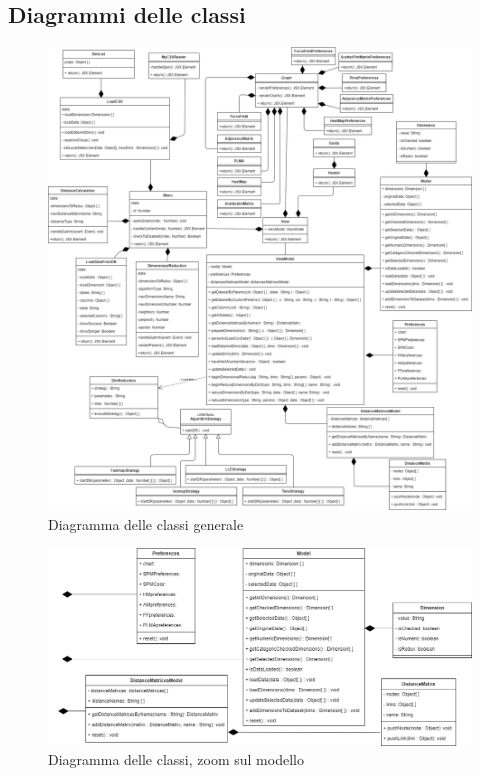 \subsection{Diagrammi delle classi}
\begin{figure}[hb]
\includegraphics[width=14.8cm]{Extra/Allegato Tecnico-Class}
\centering
\caption{Diagramma delle classi generale}
\end{figure}

\begin{landscape}
\vspace*{\fill}
\begin{figure}[hb]
\includegraphics[width=\linewidth]{Extra/Allegato Tecnico-Model}
\centering
\caption{Diagramma delle classi, zoom sul modello}
\end{figure}
\vfill
\end{landscape}

